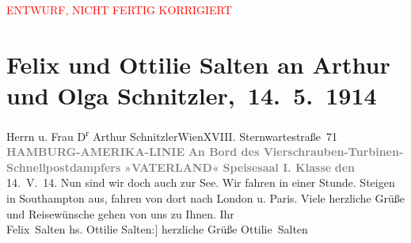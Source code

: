 
\begin{center}
            \textcolor{red}{ENTWURF, NICHT FERTIG KORRIGIERT}
                      \end{center}
            
         
         \renewcommand{\erwaehntePersonen}{Personen: Felix Salten, Ottilie Salten, Olga Schnitzler}
         \renewcommand{\erwaehnteInstitutionen}{Institutionen: Hamburg-Amerika-Linie, Schnellpostdampfer Vaterland}
         \renewcommand{\erwaehnteOrte}{Orte: Cuxhaven, London, Nordsee, Paris, Southampton, Sternwartestraße 71, Wien}
         \renewcommand{\erwaehnteWerke}{}
               \section[ Felix und Ottilie Salten an Arthur und Olga Schnitzler, 14. 5. 1914]{ Felix und Ottilie Salten an Arthur und Olga
               Schnitzler, 14. 5. 1914}\nopagebreak{}\rehead{ }\begin{ledgroupsized}[t]{13cm}\normalsize\beginnumbering \toendnotes[C]{\smallbreak\pagebreak[2]} 
\toendnotes[C]{\smallbreak}\pstart{}{\pb}Herrn u. Frau D\textsuperscript{r} Arthur Schnitzler\pend{}\pstart{}Wien\pend{}\pstart{}XVIII. Sternwartestraße 71\pend{}{\bigskip}\pstart
           \noindent{}{\pb}\textcolor{gray}{\textbf{HAMBURG-AMERIKA-LINIE}}\pend
           \pstart
           \textcolor{gray}{\textbf{An Bord des Vierschrauben-Turbinen-Schnellpostdampfers}}\pend
           \pstart
           \textcolor{gray}{\textbf{»VATERLAND«}}\pend
           \pstart
           \textcolor{gray}{\textbf{Speisesaal I. Klasse}}\pend
           \pstart
           {\pb}\textcolor{gray}{\textbf{den}}{ }14. V. 14.\pend
           \pstart
           Nun sind wir doch auch zur See. Wir fahren in einer Stunde. Steigen in Southampton aus, fahren von dort nach London u. Paris. Viele herzliche Grüße
               und Reisewünsche gehen von uns zu Ihnen. Ihr {\\}\spacefill\mbox{Felix Salten}\pend
           \pstart
           \noindent{}{[}hs. Ottilie Salten:{]} herzliche Grüße\pend
           \pstart \spacefill\mbox{Ottilie Salten}\pend{}
         

\end{ledgroupsized}
